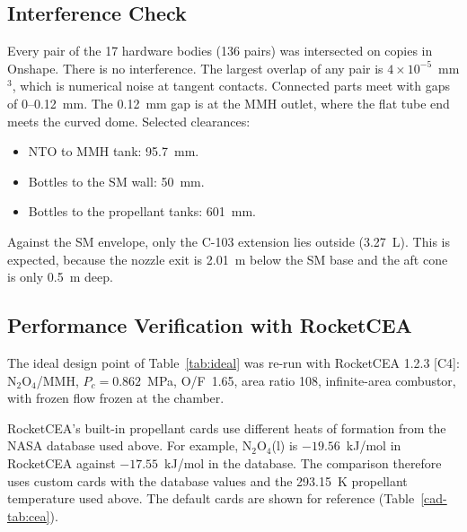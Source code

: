 \documentclass[10pt]{article}
\begin{document}
\subsection{Interference Check}
Every pair of the 17 hardware bodies (136 pairs) was intersected on copies in Onshape. There is no interference. The
largest overlap of any pair is $4\times10^{-5}$~mm$^3$, which is numerical noise at tangent contacts. Connected parts
meet with gaps of 0--0.12~mm. The 0.12~mm gap is at the MMH outlet, where the flat tube end meets the curved dome.
Selected clearances:
\begin{itemize}
\item NTO to MMH tank: 95.7~mm.
\item Bottles to the SM wall: 50~mm.
\item Bottles to the propellant tanks: 601~mm.
\end{itemize}
Against the SM envelope, only the C-103 extension lies outside (3.27~L). This is expected, because the nozzle exit is
2.01~m below the SM base and the aft cone is only 0.5~m deep.

\subsection{Performance Verification with RocketCEA}\label{cad-sec:cea}
The ideal design point of Table~\ref{tab:ideal} was re-run with RocketCEA 1.2.3 [C4]: N$_2$O$_4$/MMH, $P_c = 0.862$~MPa, O/F~1.65, area
ratio 108, infinite-area combustor, with frozen flow frozen at the chamber.

RocketCEA's built-in propellant cards use different heats of formation from the NASA database used above. For example,
N$_2$O$_4$(l) is $-19.56$~kJ/mol in RocketCEA against $-17.55$~kJ/mol in the database. The comparison therefore uses
custom cards with the database values and the 293.15~K propellant temperature used above. The default cards are shown for
reference (Table~\ref{cad-tab:cea}).
\end{document}
